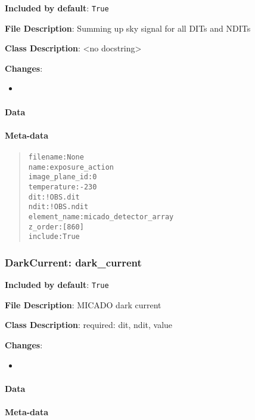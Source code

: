 \textbf{Included by default}: \texttt{True}

\textbf{File Description}: Summing up sky signal for all DITs and NDITs

\textbf{Class Description}: <no docstring>

\textbf{Changes}:

\begin{itemize}
\item \end{itemize}


\paragraph{Data%
  \label{id5}%
}


\paragraph{Meta-data%
  \label{id6}%
}

\begin{quote}
\begin{alltt}
      filename : None
          name : exposure_action
image_plane_id : 0
   temperature : -230
           dit : !OBS.dit
          ndit : !OBS.ndit
  element_name : micado_detector_array
       z_order : [860]
       include : True
\end{alltt}
\end{quote}


\subsubsection{DarkCurrent: \textquotedbl{}dark\_current\textquotedbl{}%
  \label{darkcurrent-dark-current}%
}

\textbf{Included by default}: \texttt{True}

\textbf{File Description}: MICADO dark current

\textbf{Class Description}: required: dit, ndit, value

\textbf{Changes}:

\begin{itemize}
\item \end{itemize}


\paragraph{Data%
  \label{id7}%
}


\paragraph{Meta-data%
  \label{id8}%
}

